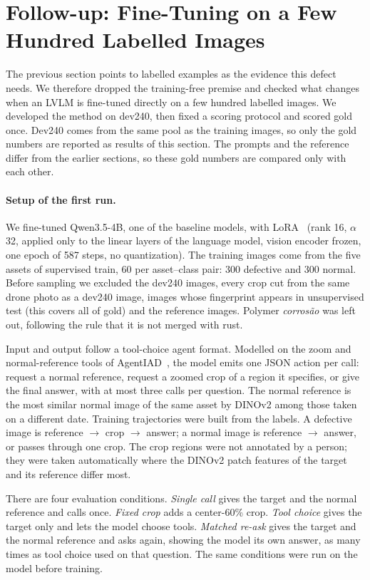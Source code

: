\documentclass[11pt]{article}
\begin{document}
\section{Follow-up: Fine-Tuning on a Few Hundred Labelled Images}\label{sec:sft}
The previous section points to labelled examples as the evidence this defect needs. We therefore dropped the training-free premise and checked what changes when an LVLM is fine-tuned directly on a few hundred labelled images. We developed the method on dev240, then fixed a scoring protocol and scored gold once. Dev240 comes from the same pool as the training images, so only the gold numbers are reported as results of this section. The prompts and the reference differ from the earlier sections, so these gold numbers are compared only with each other.

\paragraph{Setup of the first run.} We fine-tuned Qwen3.5-4B, one of the baseline models, with LoRA~\cite{hu2021lora} (rank 16, $\alpha$ 32, applied only to the linear layers of the language model, vision encoder frozen, one epoch of 587 steps, no quantization). The training images come from the five assets of supervised train, 60 per asset--class pair: 300 defective and 300 normal. Before sampling we excluded the dev240 images, every crop cut from the same drone photo as a dev240 image, images whose fingerprint appears in unsupervised test (this covers all of gold) and the reference images. Polymer \emph{corrosão} was left out, following the rule that it is not merged with rust.

Input and output follow a tool-choice agent format. Modelled on the zoom and normal-reference tools of AgentIAD~\cite{miao2025agentiad}, the model emits one JSON action per call: request a normal reference, request a zoomed crop of a region it specifies, or give the final answer, with at most three calls per question. The normal reference is the most similar normal image of the same asset by DINOv2 among those taken on a different date. Training trajectories were built from the labels. A defective image is reference $\rightarrow$ crop $\rightarrow$ answer; a normal image is reference $\rightarrow$ answer, or passes through one crop. The crop regions were not annotated by a person; they were taken automatically where the DINOv2 patch features of the target and its reference differ most.

There are four evaluation conditions. \emph{Single call} gives the target and the normal reference and calls once. \emph{Fixed crop} adds a center-60\% crop. \emph{Tool choice} gives the target only and lets the model choose tools. \emph{Matched re-ask} gives the target and the normal reference and asks again, showing the model its own answer, as many times as tool choice used on that question. The same conditions were run on the model before training.
\end{document}
